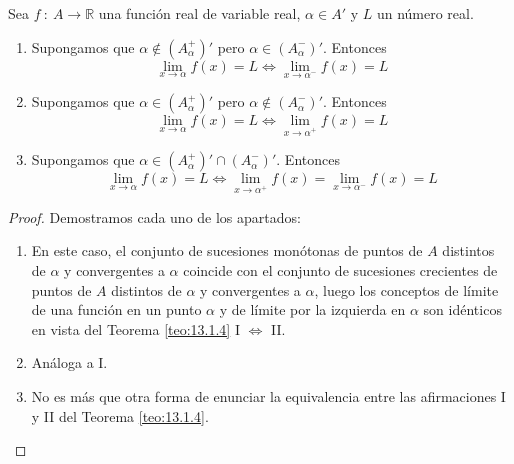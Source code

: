 \begin{prop}
    Sea $f ~:~ A \longrightarrow \mathbb{R}$ una función real de variable real, $\alpha \in A'$ y $L$ un número real.
    \begin{enumerate}
        \item Supongamos que $\alpha \notin (A_{\alpha}^{+})'$ pero $\alpha \in (A_{\alpha}^{-})'$. Entonces
        \begin{equation*}
           \lim_{x \to \alpha} f(x) = L \Longleftrightarrow \lim_{x \to \alpha^{-}} f(x) = L
        \end{equation*}

        \item Supongamos que $\alpha \in (A_{\alpha}^{+})'$ pero $\alpha \notin (A_{\alpha}^{-})'$. Entonces
        \begin{equation*}
           \lim_{x \to \alpha} f(x) = L \Longleftrightarrow \lim_{x \to \alpha^{+}} f(x) = L
        \end{equation*}

        \item Supongamos que $\alpha \in (A_{\alpha}^{+})' \cap (A_{\alpha}^{-})'$. Entonces
        \begin{equation*}
            \lim_{x \to \alpha} f(x) = L \Longleftrightarrow \lim_{x \to \alpha^{+}} f(x) = \lim_{x \to \alpha^{-}} f(x) = L
        \end{equation*}
    \end{enumerate}
\end{prop}
\begin{proof}
    Demostramos cada uno de los apartados:
    \begin{enumerate}
        \item En este caso, el conjunto de sucesiones monótonas de puntos de $A$ distintos de $\alpha$ y
        convergentes a $\alpha$ coincide con el conjunto de sucesiones crecientes de puntos de $A$ distintos
        de $\alpha$ y convergentes a $\alpha$, luego los conceptos de límite de una función en un punto $\alpha$
        y de límite por la izquierda en $\alpha$ son idénticos en vista del Teorema \ref{teo:13.1.4} I
        $\Longleftrightarrow$ II.

        \item Análoga a I.

        \item No es más que otra forma de enunciar la equivalencia entre las
        afirmaciones I y II del Teorema \ref{teo:13.1.4}.
    \end{enumerate}
\end{proof}

